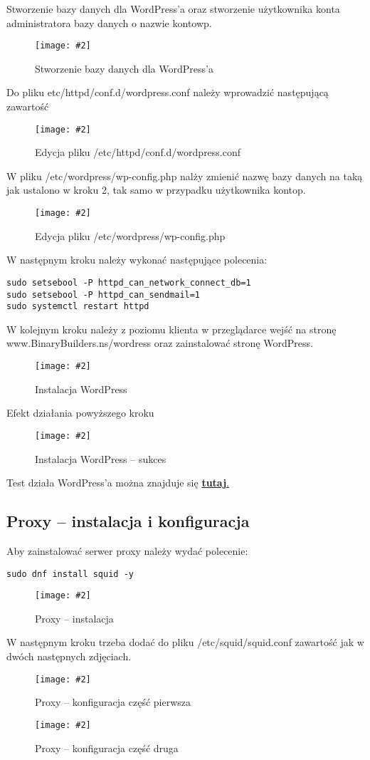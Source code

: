\documentclass[a4paper]{article}
\newcommand*{\zdj}[2][\textwidth]{\texttt{[image: \#2]}}
\newcommand*{\fg}[4][!htb]{
      \begin{figure*}[#1]
            \zdj{#2}
            \caption[#4]{#3}
      \end{figure*}
}
\begin{document}
\newpage
Stworzenie bazy danych dla WordPress'a oraz stworzenie użytkownika konta administratora bazy danych o nazwie kontowp.
\fg{contents/configuration/wordpress/2.png}{Stworzenie bazy danych dla WordPress'a}{Stworzenie bazy danych dla WordPress'a}

Do pliku etc/httpd/conf.d/wordpress.conf należy wprowadzić następującą zawartość
\newpage
\fg{contents/configuration/wordpress/3.png}{Edycja pliku /etc/httpd/conf.d/wordpress.conf}{Edycja pliku /etc/httpd/conf.d/wordpress.conf}

W pliku /etc/wordpress/wp-config.php nalży zmienić nazwę bazy danych na taką jak ustalono w kroku 2, tak samo w przypadku użytkownika kontop.
\fg{contents/configuration/wordpress/4.png}{Edycja pliku /etc/wordpress/wp-config.php}{Edycja pliku /etc/wordpress/wp-config.php}

W następnym kroku należy wykonać następujące polecenia: 
\begin{Verbatim}[frame=single]
sudo setsebool -P httpd_can_network_connect_db=1
sudo setsebool -P httpd_can_sendmail=1
sudo systemctl restart httpd
\end{Verbatim}
\newpage
W kolejnym kroku należy z poziomu klienta w przeglądarce wejść na stronę www.BinaryBuilders.ns/wordress oraz zainstalować stronę WordPress.
\fg{contents/configuration/wordpress/6.png}{Instalacja WordPress}{Instalacja WordPress}

Efekt działania powyższego kroku
\fg{contents/configuration/wordpress/7.png}{Instalacja WordPress – sukces}{Instalacja WordPress – sukces}

Test działa WordPress'a można znajduje się \hyperref[fig:wordpress-test]{\textbf{tutaj}.}

\newpage
\subsection{Proxy – instalacja i konfiguracja}
Aby zainstalować serwer proxy należy wydać polecenie: 
\begin{Verbatim}[frame=single]
sudo dnf install squid -y
\end{Verbatim}
\fg{contents/configuration/Proxy/1.png}{Proxy – instalacja}{Proxy – instalacja}

W następnym kroku trzeba dodać do pliku /etc/squid/squid.conf zawartość jak w dwóch następnych zdjęciach.
\fg{contents/configuration/Proxy/3.png}{Proxy – konfiguracja część pierwsza}{Proxy – konfiguracja część pierwsza}
\newpage
\fg{contents/configuration/Proxy/4.png}{Proxy – konfiguracja część druga}{Proxy – konfiguracja część druga}
\end{document}
